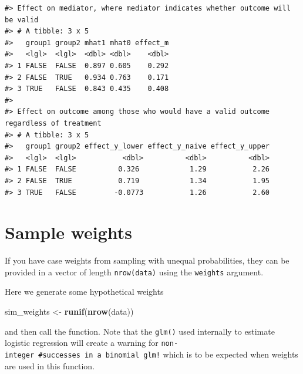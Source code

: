 \documentclass[
]{book}
\newenvironment{Shaded}{\begin{snugshade}}{\end{snugshade}}
\newcommand{\AttributeTok}[1]{\textcolor[rgb]{0.13,0.29,0.53}{#1}}
\newcommand{\CommentTok}[1]{\textcolor[rgb]{0.56,0.35,0.01}{\textit{#1}}}
\newcommand{\FunctionTok}[1]{\textcolor[rgb]{0.13,0.29,0.53}{\textbf{#1}}}
\newcommand{\NormalTok}[1]{#1}
\newcommand{\OtherTok}[1]{\textcolor[rgb]{0.56,0.35,0.01}{#1}}
\newcommand{\SpecialCharTok}[1]{\textcolor[rgb]{0.81,0.36,0.00}{\textbf{#1}}}
\newcommand{\StringTok}[1]{\textcolor[rgb]{0.31,0.60,0.02}{#1}}
\begin{document}
\begin{verbatim}
#> Effect on mediator, where mediator indicates whether outcome will be valid
#> # A tibble: 3 x 5
#>   group1 group2 mhat1 mhat0 effect_m
#>   <lgl>  <lgl>  <dbl> <dbl>    <dbl>
#> 1 FALSE  FALSE  0.897 0.605    0.292
#> 2 FALSE  TRUE   0.934 0.763    0.171
#> 3 TRUE   FALSE  0.843 0.435    0.408
#> 
#> Effect on outcome among those who would have a valid outcome regardless of treatment
#> # A tibble: 3 x 5
#>   group1 group2 effect_y_lower effect_y_naive effect_y_upper
#>   <lgl>  <lgl>           <dbl>          <dbl>          <dbl>
#> 1 FALSE  FALSE          0.326            1.29           2.26
#> 2 FALSE  TRUE           0.719            1.34           1.95
#> 3 TRUE   FALSE         -0.0773           1.26           2.60
\end{verbatim}

\hypertarget{sample-weights}{%
\section{Sample weights}\label{sample-weights}}

If you have case weights from sampling with unequal probabilities, they can be provided in a vector of length \texttt{nrow(data)} using the \texttt{weights} argument.

Here we generate some hypothetical weights

\begin{Shaded}
\begin{Highlighting}[]
\NormalTok{sim\_weights }\OtherTok{\textless{}{-}} \FunctionTok{runif}\NormalTok{(}\FunctionTok{nrow}\NormalTok{(data))}
\end{Highlighting}
\end{Shaded}

and then call the function. Note that the \texttt{glm()} used internally to estimate logistic regression will create a warning for \texttt{non-integer\ \#successes\ in\ a\ binomial\ glm!} which is to be expected when weights are used in this function.

\begin{Shaded}
\end{Shaded}
\end{document}
